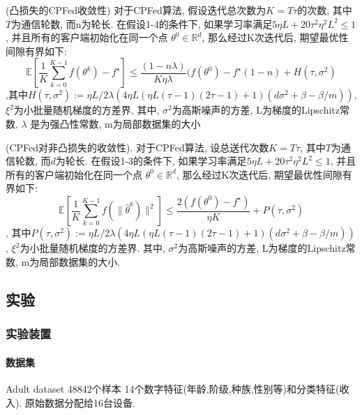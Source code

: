 \begin{theorem}
(凸损失的CPFed收敛性)
对于CPFed算法, 假设迭代总次数为$K= T\tau$的次数, 其中$T$为通信轮数, 而n为轮长. 在假设1-4的条件下, 如果学习率满足$5\eta L +20 \tau ^2\eta^2 L^2 \leqslant 1$, 并且所有的客户端初始化在同一个点 $\theta ^0 \in \mathbb{R}^d$, 那么经过K次迭代后, 期望最优性间隙有界如下:
\begin{equation}
  \mathbb{E} \left[  \frac{1}{K} \sum_{k=0}^{K-1}f(\theta^k)-f^\star \right]\leqslant
  \frac{(1-n\lambda)}{K \eta \lambda}  (f(\theta^0)-f^\star (1-n)
  +H(\tau,\sigma^2)
\end{equation}
,其中$H(\tau,\sigma^2) := \eta L /2 \lambda (4 \eta L(\eta L(\tau -1)(2 \tau-1)+1) (d \sigma^2+\beta - \beta /m ))$, $\xi^2$为小批量随机梯度的方差界, 其中, $\sigma^2$为高斯噪声的方差, L为梯度的Lipschitz常数, $\lambda$ 是为强凸性常数, m为局部数据集的大小

\end{theorem}

\begin{theorem}
(CPFed对非凸损失的收敛性). 
对于CPFed算法, 设总送代次数$K=T\tau$, 其中$T$为通信轮数, 而$d$为轮长. 
在假设1-3的条件下, 如果学习率满足$5\eta L +20 \tau ^2\eta^2 L^2 \leqslant 1$, 并且所有的客户端初始化在同一个点 $\theta ^0 \in \mathbb{R}^d$, 那么经过K次迭代后, 期望最优性间隙有界如下:
\begin{equation}
  \mathbb{E} \left[  \frac{1}{K} \sum_{k=0}^{K-1}f( \| \hat{\theta}^k) \|^2  \right]\leqslant 
  \frac{2(f(\theta^0)- f^\star)}{ \eta K} + P(\tau, \sigma^2) 
\end{equation}
, 其中$P(\tau,\sigma^2) := \eta L /2 \lambda (4 \eta L(\eta L(\tau -1)(2 \tau-1)+1) (d \sigma^2+\beta - \beta /m ))$, $\xi^2$为小批量随机梯度的方差界. 其中, $\sigma^2$为高斯噪声的方差, L为梯度的Lipschitz常数, m为局部数据集的大小.
\end{theorem}   




\subsection{实验}

\subsubsection{实验装置}
\paragraph{数据集} Adult dataset 48842个样本 14个数字特征(年龄,阶级,种族,性别等)和分类特征(收入). 原始数据分配给16台设备.
